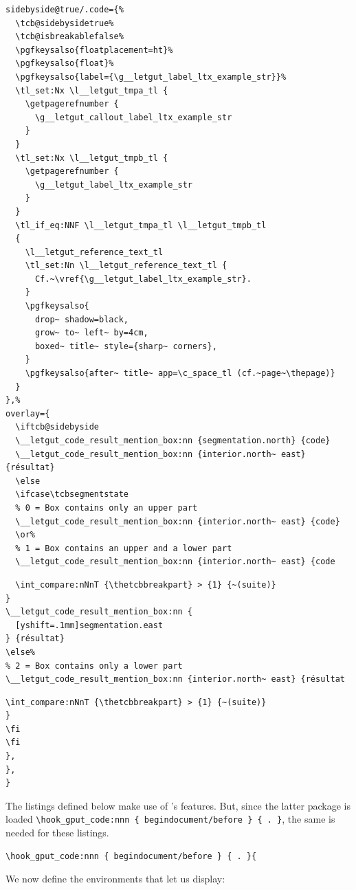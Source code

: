 \documentclass{letgut}
\begin{document}
\begin{lstlisting}
sidebyside@true/.code={%
  \tcb@sidebysidetrue%
  \tcb@isbreakablefalse%
  \pgfkeysalso{floatplacement=ht}%
  \pgfkeysalso{float}%
  \pgfkeysalso{label={\g__letgut_label_ltx_example_str}}%
  \tl_set:Nx \l__letgut_tmpa_tl {
    \getpagerefnumber {
      \g__letgut_callout_label_ltx_example_str
    }
  }
  \tl_set:Nx \l__letgut_tmpb_tl {
    \getpagerefnumber {
      \g__letgut_label_ltx_example_str
    }
  }
  \tl_if_eq:NNF \l__letgut_tmpa_tl \l__letgut_tmpb_tl
  {
    \l__letgut_reference_text_tl
    \tl_set:Nn \l__letgut_reference_text_tl {
      Cf.~\vref{\g__letgut_label_ltx_example_str}.
    }
    \pgfkeysalso{
      drop~ shadow=black,
      grow~ to~ left~ by=4cm,
      boxed~ title~ style={sharp~ corners},
    }
    \pgfkeysalso{after~ title~ app=\c_space_tl (cf.~page~\thepage)}
  }
},%
overlay={
  \iftcb@sidebyside
  \__letgut_code_result_mention_box:nn {segmentation.north} {code}
  \__letgut_code_result_mention_box:nn {interior.north~ east} {résultat}
  \else
  \ifcase\tcbsegmentstate
  % 0 = Box contains only an upper part
  \__letgut_code_result_mention_box:nn {interior.north~ east} {code}
  \or%
  % 1 = Box contains an upper and a lower part
  \__letgut_code_result_mention_box:nn {interior.north~ east} {code
\end{lstlisting}

\begin{lstlisting}
  \int_compare:nNnT {\thetcbbreakpart} > {1} {~(suite)}
}
\__letgut_code_result_mention_box:nn {
  [yshift=.1mm]segmentation.east
} {résultat}
\else%
% 2 = Box contains only a lower part
\__letgut_code_result_mention_box:nn {interior.north~ east} {résultat
\end{lstlisting}

\begin{lstlisting}
\int_compare:nNnT {\thetcbbreakpart} > {1} {~(suite)}
}
\fi
\fi
},
},
}
\end{lstlisting}

The  listings defined below make use of
's features. But, since the latter package is loaded
\lstinline+\hook_gput_code:nnn { begindocument/before } { . }+, the same is needed for these listings.

\begin{lstlisting}
\hook_gput_code:nnn { begindocument/before } { . }{
\end{lstlisting}

We now define the environments that let us display:
\end{document}
